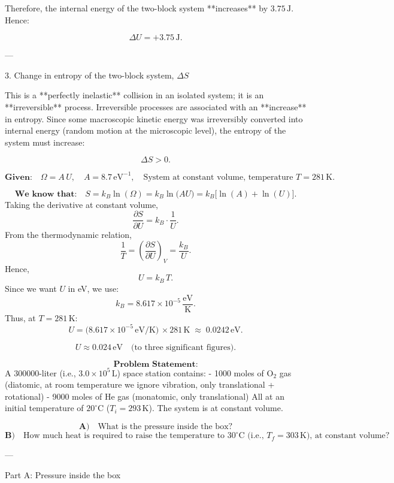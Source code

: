 \documentclass[12pt]{article}
\theoremstyle{definition} %
\theoremstyle{plain} %
\begin{document}
Therefore, the internal energy of the two-block system **increases** by \(3.75\,\text{J}\). Hence:

\[
\boxed{\Delta U = +3.75\,\text{J}}.
\]

---

3. Change in entropy of the two-block system, \(\Delta S\)

This is a **perfectly inelastic** collision in an isolated system; it is an **irreversible** process. Irreversible processes are associated with an **increase** in entropy. Since some macroscopic kinetic energy was irreversibly converted into internal energy (random motion at the microscopic level), the entropy of the system must increase:

\[
\boxed{\Delta S > 0}.
\] 

\[
\textbf{Given:} \quad \Omega = A\,U,
\quad A = 8.7\,\mathrm{eV}^{-1},
\quad \text{System at constant volume, temperature } T = 281\,\mathrm{K}.
\]

\[
\textbf{We know that:} \quad S = k_B \ln(\Omega) 
            = k_B \ln\bigl(A U\bigr)
            = k_B \bigl[\ln(A) + \ln(U)\bigr].
\]
Taking the derivative at constant volume,
\[
\frac{\partial S}{\partial U}
= k_B \cdot \frac{1}{U}.
\]
From the thermodynamic relation,
\[
\frac{1}{T} 
= \left(\frac{\partial S}{\partial U}\right)_V 
= \frac{k_B}{U}.
\]
Hence,
\[
U = k_B\,T.
\]
Since we want \(U\) in eV, we use:
\[
k_B = 8.617 \times 10^{-5}\,\frac{\mathrm{eV}}{\mathrm{K}}.
\]
Thus, at \(T=281\,\mathrm{K}\):
\[
U 
= \bigl(8.617\times 10^{-5}\,\mathrm{eV/K}\bigr)\,\times 281\,\mathrm{K}
\;\approx\;0.0242\,\mathrm{eV}.
\]

\[
\boxed{U \approx 0.024\,\mathrm{eV}} 
\quad \text{(to three significant figures).}
\] 

\[
\textbf{Problem Statement:}
\]
A 300000-liter (i.e., \(3.0\times10^5\,\mathrm{L}\)) space station contains:
- 1000 moles of \(\mathrm{O_2}\) gas (diatomic, at room temperature we ignore vibration, only translational + rotational)
- 9000 moles of He gas (monatomic, only translational)
All at an initial temperature of \(20^\circ\mathrm{C}\) (\(T_i = 293\,\mathrm{K}\)). The system is at constant volume.

\[
\textbf{A)}\quad \text{What is the pressure inside the box?}
\]
\[
\textbf{B)}\quad \text{How much heat is required to raise the temperature to }30^\circ\mathrm{C}
             \text{ (i.e., }T_f = 303\,\mathrm{K}\text{), at constant volume?}
\]

---

Part A: Pressure inside the box
\end{document}

